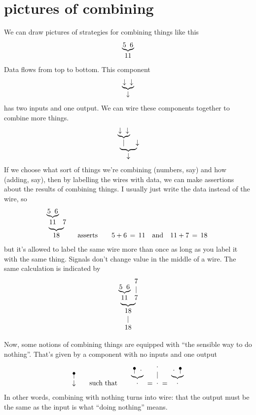 \documentclass{book}
\begin{document}
\section{pictures of combining}

\newcommand{\wye}[3]{\begin{array}[b]{@{}c@{}}\underbrace{\!\!#1\;\;#2\!\!}\\ #3\end{array}}
\newcommand{\wir}[2]{\begin{array}[b]{@{}c@{}}#1\\ \mid\\ #2\end{array}}
\newcommand{\wid}[1]{\wir{#1}{#1}}
\newcommand{\naw}[1]{\begin{array}[b]{@{}c@{}}\bullet \vspace*{-0.13in}\\ \mid \\ #1\end{array}}

We can draw pictures of strategies for combining things like this
\[
\wye{5}{6}{11}
\]
Data flows from top to bottom. This component
\[
\wye\downarrow\downarrow\downarrow
\]
has two inputs and one output. We can wire these components together to combine more things.
\[
\wye{\wye\downarrow\downarrow\mid}\downarrow\downarrow
\]
If we choose what sort of things we're combining (numbers, say) and how (adding, say), then by labelling the wires with data, we can make assertions about the results of combining things. I usually just write the data instead of the wire, so
\[
\wye{\wye{5}{6}{11}}{7}{18}
\qquad\mbox{asserts}\qquad
5 + 6 \,=\, 11\quad\mbox{and}\quad 11 + 7 \,=\, 18
\]
but it's allowed to label the same wire more than once as long as you label it with the same thing. Signals don't change value in the middle of a wire. The same calculation is indicated by
\[
\wye{\wye{5}{6}{11}}{\wid{7}}{\wid{18}}
\]

Now, some notions of combining things are equipped with ``the sensible way to do nothing''. That's given by a component with no inputs and one output
\[
\naw{\downarrow}
\qquad\mbox{such that}\qquad
\wye{\naw{}}\cdot\cdot \;=\; \wid\cdot \;=\;\wye\cdot{\naw{}}\cdot
\]
In other words, combining with nothing turns into wire: that the output must be the same as the input is what ``doing nothing'' means.
\end{document}
